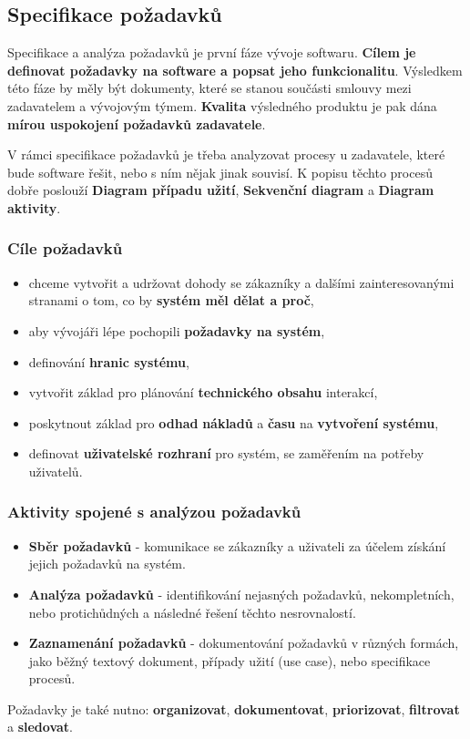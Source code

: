 \subsection{Specifikace požadavků}
Specifikace a analýza požadavků je první fáze vývoje softwaru. \textbf{Cílem je definovat požadavky na software a popsat jeho funkcionalitu}. Výsledkem této fáze by měly být dokumenty, které se stanou součásti smlouvy mezi zadavatelem a vývojovým týmem. \textbf{Kvalita} výsledného produktu je pak dána \textbf{mírou uspokojení požadavků zadavatele}.

V rámci specifikace požadavků je třeba analyzovat procesy u zadavatele, které bude software řešit, nebo s ním nějak jinak souvisí. K popisu těchto procesů dobře poslouží \textbf{Diagram případu užití}, \textbf{Sekvenční diagram} a \textbf{Diagram aktivity}.

\subsubsection{Cíle požadavků}
\begin{itemize}
\item chceme vytvořit a udržovat dohody se zákazníky a dalšími zainteresovanými stranami o tom, co by \textbf{systém měl dělat a proč},
\item aby vývojáři lépe pochopili \textbf{požadavky na systém},
\item definování \textbf{hranic systému},
\item vytvořit základ pro plánování \textbf{technického obsahu} interakcí,
\item poskytnout základ pro \textbf{odhad} \textbf{nákladů} a \textbf{času} na \textbf{vytvoření systému},
\item definovat \textbf{uživatelské rozhraní} pro systém, se zaměřením na potřeby uživatelů.
\end{itemize}

\subsubsection{Aktivity spojené s analýzou požadavků}
\begin{itemize}
	\item \textbf{Sběr požadavků} -  komunikace se zákazníky a uživateli za účelem získání jejich požadavků na systém.
	\item \textbf{Analýza požadavků} - identifikování nejasných požadavků, nekompletních, nebo protichůdných a následné řešení těchto nesrovnalostí.
	\item \textbf{Zaznamenání požadavků} - dokumentování požadavků v různých formách, jako běžný textový dokument, případy užití (use case), nebo specifikace procesů.
\end{itemize}
Požadavky je také nutno: \textbf{organizovat}, \textbf{dokumentovat}, \textbf{priorizovat}, \textbf{filtrovat} a \textbf{sledovat}.

